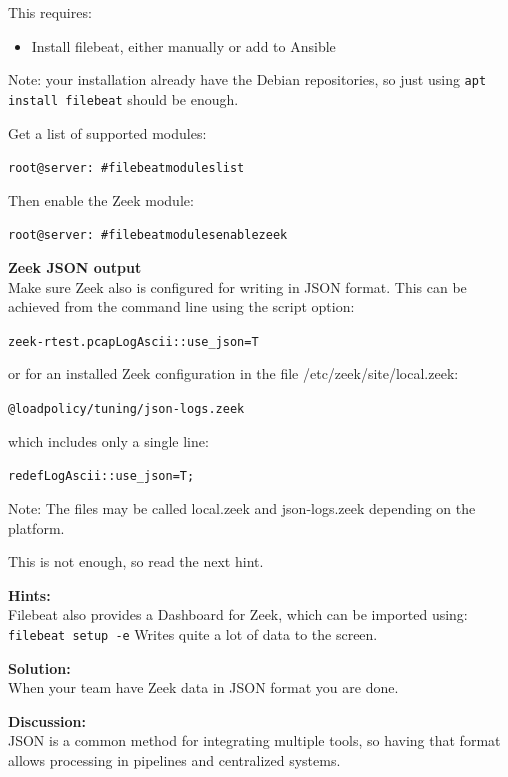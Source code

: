 \documentclass[a4paper,11pt,notitlepage]{report}
\begin{document}
This requires:
\begin{itemize}
\item Install filebeat, either manually or add to Ansible
\end{itemize}

Note: your installation already have the Debian repositories, so just using \verb+apt install filebeat+ should be enough.

Get a list of supported modules:
\begin{alltt}
root@server:~# filebeat modules list
\end{alltt}

Then enable the Zeek module:
\begin{alltt}
root@server:~# filebeat modules enable zeek
\end{alltt}

{\bf Zeek JSON output}\\
Make sure Zeek also is configured for writing in JSON format. This can be achieved from the command line using the script option:
\begin{alltt}
zeek -r test.pcap LogAscii::use_json=T
\end{alltt}

or for an installed Zeek configuration in the file /etc/zeek/site/local.zeek:
\begin{alltt}
@load policy/tuning/json-logs.zeek
\end{alltt}

which includes only a single line:
\begin{alltt}
redef LogAscii::use_json=T;
\end{alltt}

Note: The files may be called local.zeek and json-logs.zeek depending on the platform.

This is not enough, so read the next hint.

{\bf Hints:}\\
Filebeat also provides a Dashboard for Zeek, which can be imported using:\\
\verb+filebeat setup -e+
Writes quite a lot of data to the screen.


{\bf Solution:}\\
When your team have Zeek data in JSON format you are done.

{\bf Discussion:}\\
JSON is a common method for integrating multiple tools, so having that format allows processing in pipelines and centralized systems.
\end{document}
